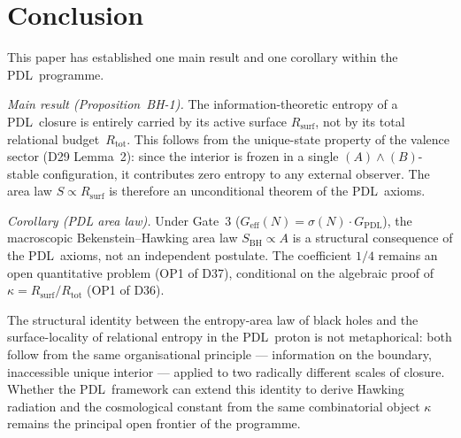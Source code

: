 \documentclass[11pt,a4paper]{article}
\theoremstyle{plain}
\theoremstyle{definition}
\theoremstyle{remark}
\newcommand{\PDL}{\textsc{PDL}}
\newcommand{\Rtot}{R_{\mathrm{tot}}}
\newcommand{\Rsurf}{R_{\mathrm{surf}}}
\newcommand{\kap}{\kappa}
\newcommand{\sig}{\sigma}
\newcommand{\GPDL}{G_{\mathrm{PDL}}}
\newcommand{\Geff}{G_{\mathrm{eff}}}
\newcommand{\SBH}{S_{\mathrm{BH}}}
\begin{document}
\section{Conclusion}

This paper has established one main result and one corollary within the \PDL\
programme.

\emph{Main result (Proposition~BH-1).} The information-theoretic entropy of a \PDL\
closure is entirely carried by its active surface $\Rsurf$, not by its total
relational budget~$\Rtot$. This follows from the unique-state property of the valence
sector (D29 Lemma~2): since the interior is frozen in a single $(A)\wedge(B)$-stable
configuration, it contributes zero entropy to any external observer. The area law
$S \propto \Rsurf$ is therefore an unconditional theorem of the \PDL\ axioms.

\emph{Corollary (PDL area law).} Under Gate~3 ($\Geff(N) = \sig(N)\cdot\GPDL$),
the macroscopic Bekenstein--Hawking area law $\SBH \propto A$ is a structural
consequence of the \PDL\ axioms, not an independent postulate. The coefficient
$1/4$ remains an open quantitative problem (OP1 of D37), conditional on the
algebraic proof of $\kap = \Rsurf/\Rtot$ (OP1 of D36).

The structural identity between the entropy-area law of black holes and the
surface-locality of relational entropy in the \PDL\ proton is not metaphorical:
both follow from the same organisational principle --- information on the boundary,
inaccessible unique interior --- applied to two radically different scales of closure.
Whether the \PDL\ framework can extend this identity to derive Hawking radiation and
the cosmological constant from the same combinatorial object $\kap$ remains the
principal open frontier of the programme.


\end{document}
